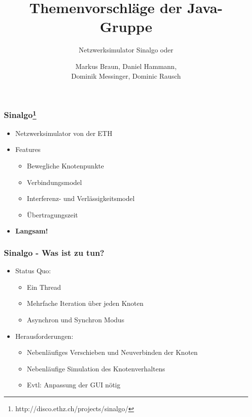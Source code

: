 \documentclass[24pt]{beamer}
\title{Themenvorschläge der Java-Gruppe}
\subtitle{Netzwerksimulator Sinalgo oder}
\author{Markus Braun, Daniel Hammann,\\ 
	Dominik Messinger, Dominic Rausch}
\begin{document}
	\maketitle

	\begin{frame}[c]\frametitle{Sinalgo\footnote{http://disco.ethz.ch/projects/sinalgo/} }
		\begin{itemize}
			\item Netzwerksimulator von der ETH
			\item Features
			\begin{itemize}
				\item Bewegliche Knotenpunkte
				\item Verbindungsmodel
				\item Interferenz- und Verlässigkeitsmodel
				\item Übertragungszeit
			\end{itemize}
			\item \textbf{Langsam!}
		\end{itemize}
	\end{frame}

	\begin{frame}[c]\frametitle{Sinalgo - Was ist zu tun?}
		\begin{itemize}
			\item Status Quo:
		    \begin{itemize}
		    	\item Ein Thread
		    	\item Mehrfache Iteration über jeden Knoten
		    	\item Asynchron und Synchron Modus
		    \end{itemize}
		    \item Herausforderungen:
		    \begin{itemize}
		    	\item Nebenläufiges Verschieben und Neuverbinden der Knoten
		    	\item Nebenläufige Simulation des Knotenverhaltens
		    	\item Evtl: Anpassung der GUI nötig
		    \end{itemize}
		\end{itemize}
	\end{frame}
\end{document}
